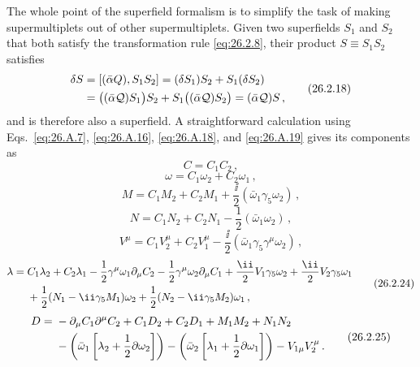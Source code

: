 The whole point of the superfield formalism is to simplify the task of making
supermultiplets out of other supermultiplets. Given two superfields $S_1$ and
$S_2$ that both satisfy the transformation rule \eqref{eq:26.2.8}, their
product $S\equiv S_1S_2$ satisfies
\begin{equation}
  \begin{aligned}
  \delta S&=[(\bar\alpha Q),S_1S_2]
  =(\delta S_1)S_2+S_1(\delta S_2)\\
  &=\bigl((\bar\alpha\mathcal{Q})S_1\bigr)S_2
    +S_1\bigl((\bar\alpha\mathcal{Q})S_2\bigr)
  =(\bar\alpha\mathcal{Q})S\,,
  \end{aligned}
  \tag{26.2.18}\label{eq:26.2.18}
\end{equation}
and is therefore also a superfield. A straightforward calculation using
Eqs.~\eqref{eq:26.A.7}, \eqref{eq:26.A.16}, \eqref{eq:26.A.18}, and
\eqref{eq:26.A.19} gives its components as
\begin{equation}
  C=C_1C_2\,,
  \tag{26.2.19}\label{eq:26.2.19}
\end{equation}
\begin{equation}
  \omega=C_1\omega_2+C_2\omega_1\,,
  \tag{26.2.20}\label{eq:26.2.20}
\end{equation}
\begin{equation}
  M=C_1M_2+C_2M_1+\frac{\ii}{2}(\bar\omega_1\gamma_5\omega_2)\,,
  \tag{26.2.21}\label{eq:26.2.21}
\end{equation}
\begin{equation}
  N=C_1N_2+C_2N_1-\frac12(\bar\omega_1\omega_2)\,,
  \tag{26.2.22}\label{eq:26.2.22}
\end{equation}
\begin{equation}
  V^\mu=C_1V_2^\mu+C_2V_1^\mu
  -\frac{\ii}{2}(\bar\omega_1\gamma_5\gamma^\mu\omega_2)\,,
  \tag{26.2.23}\label{eq:26.2.23}
\end{equation}
\begin{equation}
  \begin{aligned}
  \lambda={}&C_1\lambda_2+C_2\lambda_1
  -\frac12\gamma^\mu\omega_1\partial_\mu C_2
  -\frac12\gamma^\mu\omega_2\partial_\mu C_1
  +\frac{\ii}{2}\sl{V}_1\gamma_5\omega_2
  +\frac{\ii}{2}\sl{V}_2\gamma_5\omega_1\\
  &+\frac12(N_1-\ii\gamma_5M_1)\omega_2
  +\frac12(N_2-\ii\gamma_5M_2)\omega_1\,,
  \end{aligned}
  \tag{26.2.24}\label{eq:26.2.24}
\end{equation}
\begin{equation}
  \begin{aligned}
  D={}&-\partial_\mu C_1\partial^\mu C_2+C_1D_2+C_2D_1
  +M_1M_2+N_1N_2\\
  &-\left(\bar\omega_1
    \left[\lambda_2+\frac12\sl{\partial}\omega_2\right]\right)
  -\left(\bar\omega_2
    \left[\lambda_1+\frac12\sl{\partial}\omega_1\right]\right)
  -V_{1\mu}V_2^\mu\,.
  \end{aligned}
  \tag{26.2.25}\label{eq:26.2.25}
\end{equation}
